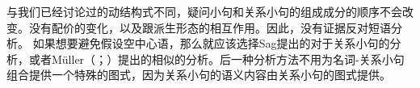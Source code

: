\begin{exe}
\begin{xlist}[iv.]
\begin{exe}
\begin{xlist}[iv.]
与我们已经讨论过的动结构式不同，疑问小句和关系小句的组成成分的顺序不会改变。没有配价的变化，以及跟派生形态的相互作用。因此，没有证据反对短语分析。
如果想要避免假设空中心语，那么就应该选择Sag提出的对于关系小句的分析，或者Müller（\citeyear[\S~10]{Mueller99a}；\citeyear[\S~11]{MuellerLehrbuch1}）提出的相似的分析。后一种分析方法不用为名词-关系小句组合提供一个特殊的图式，因为关系小句的语义内容由关系小句的图式提供。%


\end{xlist}
\end{exe}
\end{xlist}
\end{exe}
